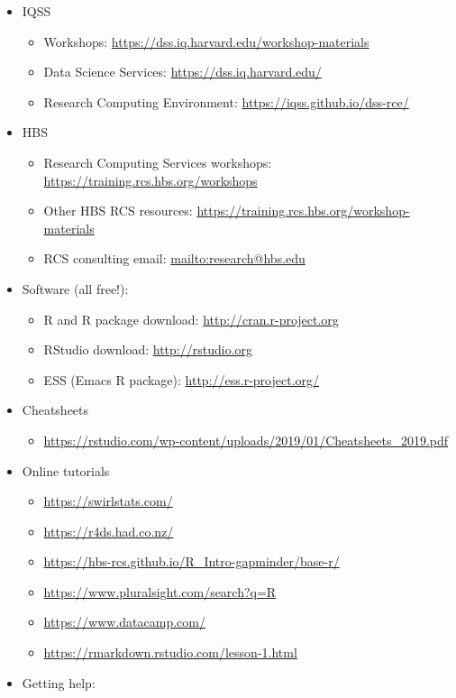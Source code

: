 \documentclass[]{book}
\providecommand{\tightlist}{%
  \setlength{\itemsep}{0pt}\setlength{\parskip}{0pt}}
\begin{document}
\begin{itemize}
\tightlist
\item
  IQSS

  \begin{itemize}
  \tightlist
  \item
    Workshops: \url{https://dss.iq.harvard.edu/workshop-materials}
  \item
    Data Science Services: \url{https://dss.iq.harvard.edu/}
  \item
    Research Computing Environment: \url{https://iqss.github.io/dss-rce/}
  \end{itemize}
\item
  HBS

  \begin{itemize}
  \tightlist
  \item
    Research Computing Services workshops: \url{https://training.rcs.hbs.org/workshops}
  \item
    Other HBS RCS resources: \url{https://training.rcs.hbs.org/workshop-materials}
  \item
    RCS consulting email: \url{mailto:research@hbs.edu}
  \end{itemize}
\item
  Software (all free!):

  \begin{itemize}
  \tightlist
  \item
    R and R package download: \url{http://cran.r-project.org}
  \item
    RStudio download: \url{http://rstudio.org}
  \item
    ESS (Emacs R package): \url{http://ess.r-project.org/}
  \end{itemize}
\item
  Cheatsheets

  \begin{itemize}
  \tightlist
  \item
    \url{https://rstudio.com/wp-content/uploads/2019/01/Cheatsheets_2019.pdf}
  \end{itemize}
\item
  Online tutorials

  \begin{itemize}
  \tightlist
  \item
    \url{https://swirlstats.com/}
  \item
    \url{https://r4ds.had.co.nz/}
  \item
    \url{https://hbs-rcs.github.io/R_Intro-gapminder/base-r/}
  \item
    \url{https://www.pluralsight.com/search?q=R}
  \item
    \url{https://www.datacamp.com/}
  \item
    \url{https://rmarkdown.rstudio.com/lesson-1.html}
  \end{itemize}
\item
  Getting help:


\end{itemize}
\end{document}
